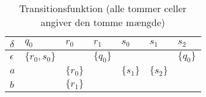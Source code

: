 \begin{table}[H]
\centering
\footnotesize
{}
\begin{tabular}{l@{\hskip\tabcolsep\vrule width 1pt\hskip\tabcolsep}l|l|l|l|l|l}

$\delta$   & $q_0$          & $r_0$     & $r_1$     & $s_0$     & $s_1$     & $s_2$ \\ \bottomrule
$\epsilon$ & $\{r_0, s_0\}$ &           & $\{q_0\}$ &           &           & $\{q_0\}$ \\
$a$        &                & $\{r_0\}$ &           & $\{s_1\}$ & $\{s_2\}$ &       \\
$b$        &                & $\{r_1\}$ &           &           &           &

\end{tabular}
	\caption{Transitionsfunktion (alle tommer celler angiver den tomme mængde)}
    \label{tab:regextonfa}
\end{table}


